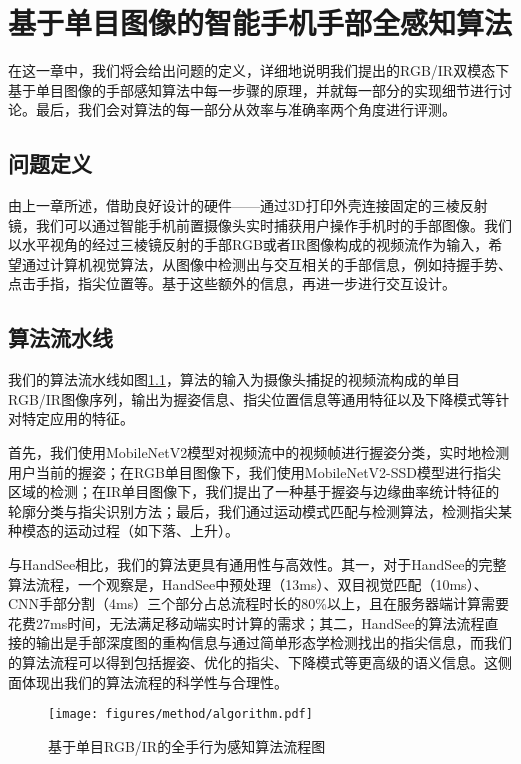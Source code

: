 \chapter{基于单目图像的智能手机手部全感知算法}
\label{cha:method}

在这一章中，我们将会给出问题的定义，详细地说明我们提出的RGB/IR双模态下基于单目图像的手部感知算法中每一步骤的原理，并就每一部分的实现细节进行讨论。最后，我们会对算法的每一部分从效率与准确率两个角度进行评测。

\section{问题定义}
由上一章所述，借助良好设计的硬件——通过3D打印外壳连接固定的三棱反射镜，我们可以通过智能手机前置摄像头实时捕获用户操作手机时的手部图像。我们以水平视角的经过三棱镜反射的手部RGB或者IR图像构成的视频流作为输入，希望通过计算机视觉算法，从图像中检测出与交互相关的手部信息，例如持握手势、点击手指，指尖位置等。基于这些额外的信息，再进一步进行交互设计。


\section{算法流水线}

我们的算法流水线如图\ref{fig:algorithm}，算法的输入为摄像头捕捉的视频流构成的单目RGB/IR图像序列，输出为握姿信息、指尖位置信息等通用特征以及下降模式等针对特定应用的特征。

首先，我们使用MobileNetV2模型对视频流中的视频帧进行握姿分类，实时地检测用户当前的握姿；在RGB单目图像下，我们使用MobileNetV2-SSD模型进行指尖区域的检测；在IR单目图像下，我们提出了一种基于握姿与边缘曲率统计特征的轮廓分类与指尖识别方法；最后，我们通过运动模式匹配与检测算法，检测指尖某种模态的运动过程（如下落、上升）。

与HandSee相比，我们的算法更具有通用性与高效性。其一，对于HandSee的完整算法流程，一个观察是，HandSee中预处理（13ms）、双目视觉匹配（10ms）、CNN手部分割（4ms）三个部分占总流程时长的80\%以上，且在服务器端计算需要花费27ms时间，无法满足移动端实时计算的需求；其二，HandSee的算法流程直接的输出是手部深度图的重构信息与通过简单形态学检测找出的指尖信息，而我们的算法流程可以得到包括握姿、优化的指尖、下降模式等更高级的语义信息。这侧面体现出我们的算法流程的科学性与合理性。

\begin{figure}
\centering
\texttt{[image: figures/method/algorithm.pdf]}
\caption{基于单目RGB/IR的全手行为感知算法流程图}
\label{fig:algorithm}
\end{figure}

